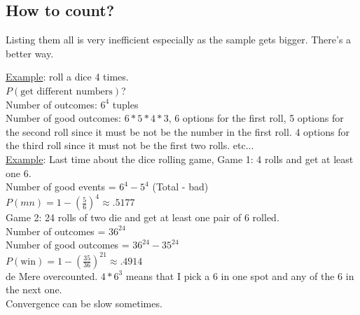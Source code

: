   \subsection*{How to count?}
    Listing them all is very inefficient especially as the sample gets bigger.
    There's a better way.
    \begin{center}
    \end{center}
    \underline{Example}: roll a dice 4 times.\\
    $P(\text{get different numbers})$?\\
    Number of outcomes: $6^4$ tuples\\
    Number of good outcomes: $6*5*4*3$, 6 options for the first roll, 5 options
    for the second roll since it must be not be the number in the first roll.
    4 options for the third roll since it must not be the first two rolls. 
    etc...\\
    \underline{Example}: Last time about the dice rolling game,
    Game 1: 4 rolls and get at least one 6.\\
    Number of good events = $6^4 - 5^4$ (Total - bad)\\
    $P(mn) = 1 - (\frac{5}{6})^4 \approx .5177$\\
    Game 2: 24 rolls of two die and get at least one pair of 6 rolled.\\
    Number of outcomes = $36^24$\\
    Number of good outcomes = $36^24 - 35^24$\\
    $P(\text{win}) = 1 - \left(\frac{35}{36}\right)^{21} \approx .4914$\\
    de Mere overcounted. $4*6^3$ means that I pick a 6 in one spot and 
    any of the 6 in the next one.\\
    Convergence can be slow sometimes.

